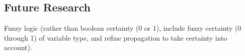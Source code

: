
\subsection{Future Research}


Fuzzy logic (rather than boolean certainty (0 or 1), include fuzzy certainty (0 through 1) of variable type, and refine propagation to take certainty into account).
